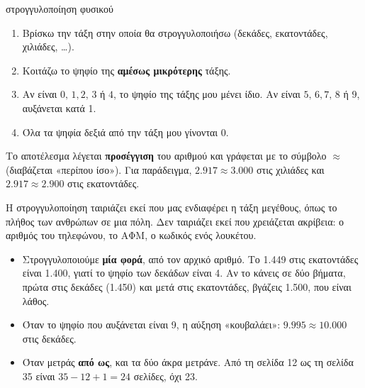 \begin{center}
\end{center}


\begin{kanonas}{στρογγυλοποίηση φυσικού}
\begin{enumerate}[leftmargin=1.6em,itemsep=0.2ex,topsep=2pt]
\item Βρίσκω την τάξη στην οποία θα στρογγυλοποιήσω (δεκάδες, εκατοντάδες, χιλιάδες, \dots).
\item Κοιτάζω το ψηφίο της \textbf{αμέσως μικρότερης} τάξης.
\item Αν είναι $0,\,1,2,\,3$ ή $4$, το ψηφίο της τάξης μου μένει ίδιο. Αν είναι $5,\,6,7,\,8$ ή $9$, αυξάνεται κατά 1.
\item Όλα τα ψηφία δεξιά από την τάξη μου γίνονται 0.
\end{enumerate}
\end{kanonas}

Το αποτέλεσμα λέγεται \textbf{προσέγγιση} του αριθμού και γράφεται με το σύμβολο $\approx$ (διαβάζεται «περίπου ίσο»). Για παράδειγμα, $2.917\approx 3.000$ στις χιλιάδες και $2.917\approx 2.900$ στις εκατοντάδες.

Η στρογγυλοποίηση ταιριάζει εκεί που μας ενδιαφέρει η τάξη μεγέθους, όπως το πλήθος των ανθρώπων σε μια πόλη. Δεν ταιριάζει εκεί που χρειάζεται ακρίβεια: ο αριθμός του τηλεφώνου, το ΑΦΜ, ο κωδικός ενός λουκέτου.

\begin{prosoxi}
\begin{itemize}[leftmargin=1.2em,itemsep=0.3ex,topsep=2pt]
\item Στρογγυλοποιούμε \textbf{μία φορά}, από τον αρχικό αριθμό. Το 1.449 στις εκατοντάδες είναι 1.400, γιατί το ψηφίο των δεκάδων είναι 4. Αν το κάνεις σε δύο βήματα, πρώτα στις δεκάδες (1.450) και μετά στις εκατοντάδες, βγάζεις 1.500, που είναι λάθος.
\item Όταν το ψηφίο που αυξάνεται είναι 9, η αύξηση «κουβαλάει»: $9.995\approx 10.000$ στις δεκάδες.
\item Όταν μετράς \textbf{από ως}, και τα δύο άκρα μετράνε. Από τη σελίδα 12 ως τη σελίδα 35 είναι $35-12+1=24$ σελίδες, όχι 23.
\end{itemize}
\end{prosoxi}

